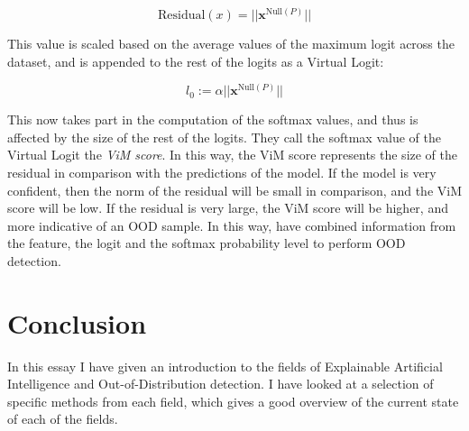 \documentclass[conference]{IEEEtran}
\begin{document}
\begin{equation}
\text{Residual}(x) = || \bm{x}^{\text{Null}(P)}||
\label{virtuallogit}
\end{equation}

This value is scaled based on the average values of the maximum logit across the dataset, and is appended to the rest of the logits as a Virtual Logit:

\begin{equation}
l_0 := \alpha || \bm{x}^{\text{Null}(P)}||
\label{virtuallogit}
\end{equation}

This now takes part in the computation of the softmax values, and thus is affected by the size of the rest of the logits. They call the softmax value of the Virtual Logit the {\it ViM score}. In this way, the ViM score represents the size of the residual in comparison with the predictions of the model. If the model is very confident, then the norm of the residual will be small in comparison, and the ViM score will be low. If the residual is very large, the ViM score will be higher, and more indicative of an OOD sample. In this way, \cite{vim} have combined information from the feature, the logit and the softmax probability level to perform OOD detection.

\section{Conclusion}

In this essay I have given an introduction to the fields of Explainable Artificial Intelligence and Out-of-Distribution detection. I have looked at a selection of specific methods from each field, which gives a good overview of the current state of each of the fields.




\end{document}
